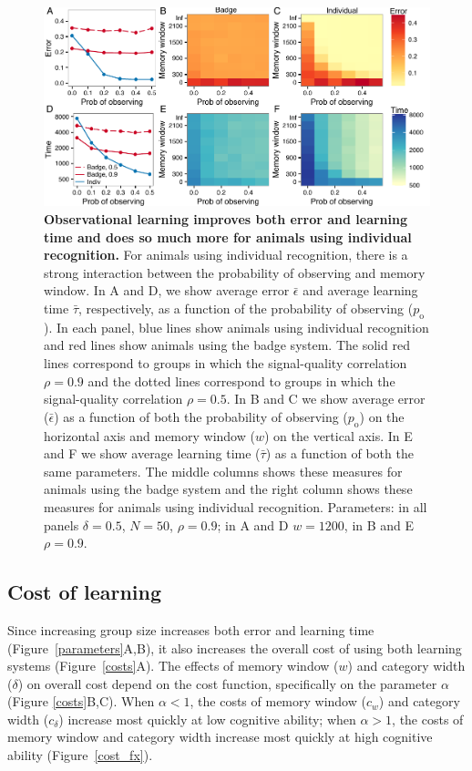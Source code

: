 \begin{figure}
\includegraphics[width=6.85in]{figures/observational_learning.pdf}
\caption{\sffamily\small\textbf{Observational learning improves both error and learning time and does so much more for animals using individual recognition.} For animals using individual recognition, there is a strong interaction between the probability of observing and memory window. In A and D, we show average error $\bar{\epsilon}$ and average learning time $\bar{\tau}$, respectively, as a function of the probability of observing ($p_\text{o}$). In each panel, blue lines show animals using individual recognition and red lines show animals using the badge system. The solid red lines correspond to groups in which the signal-quality correlation $\rho=0.9$ and the dotted lines correspond to groups in which the signal-quality correlation $\rho=0.5$. In B and C we show average error ($\bar{\epsilon}$) as a function of both the probability of observing ($p_\text{o}$) on the horizontal axis and memory window ($w$) on the vertical axis. In E and F we show average learning time ($\bar{\tau}$) as a function of both the same parameters. The middle columns shows these measures for animals using the badge system and the right column shows these measures for animals using individual recognition. Parameters: in all panels $\delta = 0.5$, $N=50$, $\rho=0.9$; in A and D $w=1200$, in B and E $\rho=0.9$.}
\label{observational}
\end{figure}

%
\subsection*{Cost of learning}
% 
Since increasing group size increases both error and learning time (Figure~\ref{parameters}A,B), it also increases the overall cost of using both learning systems (Figure~\ref{costs}A). The effects of memory window ($w$) and category width ($\delta$) on overall cost depend on the cost function, specifically on the parameter $\alpha$ (Figure \ref{costs}B,C). When $\alpha<1$, the costs of memory window ($c_w$) and category width ($c_\delta$) increase most quickly at low cognitive ability; when $\alpha>1$, the costs of memory window and category width increase most quickly at high cognitive ability (Figure~\ref{cost_fx}). 

